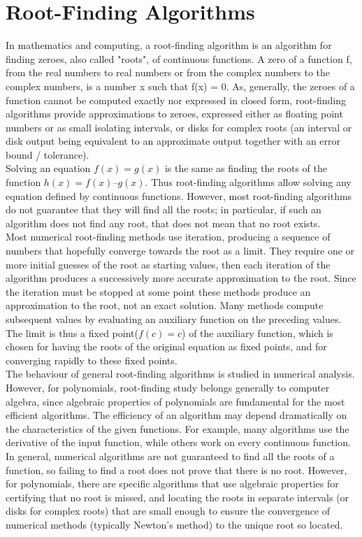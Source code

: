 \documentclass[a4paper, 12pt]{report}
\begin{document}
    \chapter{Root-Finding Algorithms}
In mathematics and computing, a root-finding algorithm is an algorithm for finding zeroes, also called "roots", of continuous functions. A zero of a function f, from the real numbers to real numbers or from the complex numbers to the complex numbers, is a number x such that f(x) = 0. As, generally, the zeroes of a function cannot be computed exactly nor expressed in closed form, root-finding algorithms provide approximations to zeroes, expressed either as floating point numbers or as small isolating intervals, or disks for complex roots (an interval or disk output being equivalent to an approximate output together with an error bound / tolerance).\\
Solving an equation $f(x) = g(x)$ is the same as finding the roots of the function $h(x) = f(x) – g(x)$. Thus root-finding algorithms allow solving any equation defined by continuous functions. However, most root-finding algorithms do not guarantee that they will find all the roots; in particular, if such an algorithm does not find any root, that does not mean that no root exists.\\
Most numerical root-finding methods use iteration, producing a sequence of numbers that hopefully converge towards the root as a limit. They require one or more initial guesses of the root as starting values, then each iteration of the algorithm produces a successively more accurate approximation to the root. Since the iteration must be stopped at some point these methods produce an approximation to the root, not an exact solution. Many methods compute subsequent values by evaluating an auxiliary function on the preceding values. The limit is thus a fixed point($f(c) = c$) of the auxiliary function, which is chosen for having the roots of the original equation as fixed points, and for converging rapidly to these fixed points.\\
The behaviour of general root-finding algorithms is studied in numerical analysis. However, for polynomials, root-finding study belongs generally to computer algebra, since algebraic properties of polynomials are fundamental for the most efficient algorithms. The efficiency of an algorithm may depend dramatically on the characteristics of the given functions. For example, many algorithms use the derivative of the input function, while others work on every continuous function. In general, numerical algorithms are not guaranteed to find all the roots of a function, so failing to find a root does not prove that there is no root. However, for polynomials, there are specific algorithms that use algebraic properties for certifying that no root is missed, and locating the roots in separate intervals (or disks for complex roots) that are small enough to ensure the convergence of numerical methods (typically Newton's method) to the unique root so located.
\end{document}
